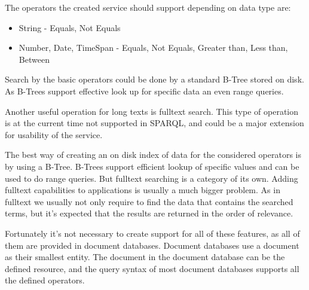 The operators the created service should support depending on data type are:
\begin{itemize}
	\item String - Equals, Not Equals
	\item Number, Date, TimeSpan - Equals, Not Equals, Greater than, Less than, Between
\end{itemize}

Search by the basic operators could be done by a standard B-Tree stored on disk. As B-Trees support effective look up for specific data an even range queries.

Another useful operation for long texts is fulltext search. %
This type of operation is at the current time not supported in SPARQL, and could be a major extension for usability of the service.

The best way of creating an on disk index of data for the considered operators is by using a B-Tree. 
B-Trees support efficient lookup of specific values and can be used to do range queries. But fulltext searching is a category of its own. Adding fulltext capabilities to applications is usually a much bigger problem. As in fulltext we usually not only require to find the data that contains the searched terms, but it's expected that the results are returned in the order of relevance.

Fortunately it's not necessary to create support for all of these features, as all of them are provided in document databases. Document databases use a document as their smallest entity. The document in the document database can be the defined resource, and the query syntax of most document databases supports all the defined operators.


